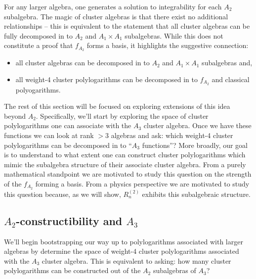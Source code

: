 \documentclass[11pt]{article}
\def\pdfeq#1{\texorpdfstring{$#1$}{a}}
\begin{document}
For any larger algebra, one generates a solution to integrability for each $A_2$ subalgebra. The magic of cluster algebras is that there exist no additional relationships -- this is equivalent to the statement that all cluster algebras can be fully decomposed in to $A_2$ and $A_1 \times A_1$ subalgebras. While this does not constitute a proof that $f_{A_2}$ forms a basis, it highlights the suggestive connection:
\begin{itemize}
	\item all cluster algebras can be decomposed in to  $A_2$ and $A_1\times A_1$ subalgebras and,
	\item all weight-4 cluster polylogarithms can be decomposed in to $f_{A_2}$ and classical polyogarithms. 
\end{itemize}
The rest of this section will be focused on exploring extensions of this idea beyond $A_2$. Specifically, we'll start by exploring the space of cluster polylogarithms one can associate with the $A_3$ cluster algebra. Once we have these functions we can look at rank $>3$ algebras and ask: which weight-4 cluster polylogarithms can be decomposed in to ``$A_3$ functions''? More broadly, our goal is to understand to what extent one can construct cluster polylogarithms which mimic the subalgebra structure of their associate cluster algebra. From a purely mathematical standpoint we are motivated to study this question on the strength of the $f_{A_2}$ forming a basis. From a physics perspective we are motivated to study this question because, as we will show, $R^{(2)}_n$ exhibits this subalgebraic structure. 

\subsection{\pdfeq{A_2}-constructibility and \pdfeq{A_3}}

We'll begin bootstrapping our way up to polylogarithms associated with larger algebras by determine the space of weight-4 cluster polylogarithms associated with the $A_3$ cluster algebra. This is equivalent to asking: how many cluster polylogarithms can be constructed out of the $A_2$ subalgebras of $A_3$? 
\end{document}
